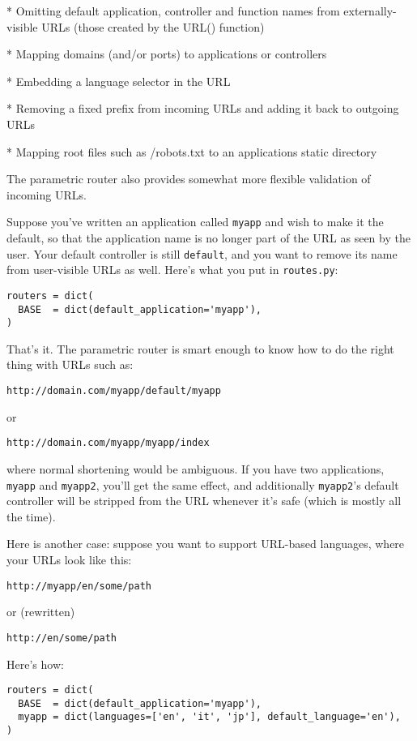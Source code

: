 \documentclass[justified,sixbynine,notoc]{tufte-book}
\def\ft{\small\tt}
\begin{document}
\begin{fullwidth}
* Omitting default application, controller and function names from externally-visible URLs (those created by the URL() function)

* Mapping domains (and/or ports) to applications or controllers

* Embedding a language selector in the URL

* Removing a fixed prefix from incoming URLs and adding it back to outgoing URLs

* Mapping root files such as /robots.txt to an applications static directory

The parametric router also provides somewhat more flexible validation of incoming URLs.

Suppose you've written an application called {\ft myapp} and wish to make it the default, so that the application name is no longer part of the URL as seen by the user. Your default controller is still {\ft default}, and you want to remove its name from user-visible URLs as well. Here's what you put in {\ft routes.py}:
\begin{lstlisting}
routers = dict(
  BASE  = dict(default_application='myapp'),
)
\end{lstlisting}

That's it. The parametric router is smart enough to know how to do the right thing with URLs such as:
\begin{lstlisting}[keywords={}]
http://domain.com/myapp/default/myapp
\end{lstlisting}
or
\begin{lstlisting}[keywords={}]
http://domain.com/myapp/myapp/index
\end{lstlisting}
where normal shortening would be ambiguous. If you have two applications, {\ft myapp} and {\ft myapp2}, you'll get the same effect, and additionally {\ft myapp2}'s default controller will be stripped from the URL whenever it's safe (which is mostly all the time).

Here is another case: suppose you want to support URL-based languages, where your URLs look like this:
\begin{lstlisting}[keywords={}]
http://myapp/en/some/path
\end{lstlisting}
or (rewritten)
\begin{lstlisting}[keywords={}]
http://en/some/path
\end{lstlisting}

Here's how:
\begin{lstlisting}
routers = dict(
  BASE  = dict(default_application='myapp'),
  myapp = dict(languages=['en', 'it', 'jp'], default_language='en'),
)
\end{lstlisting}


\end{fullwidth}
\end{document}
